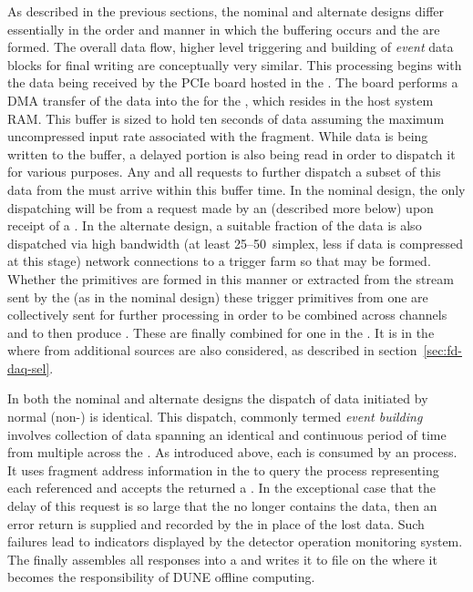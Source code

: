 As described in the previous sections, the nominal and alternate
designs differ essentially in the order and manner in which the
 buffering occurs and the  are
formed. 
The overall data flow, higher level triggering and building of
\textit{event} data blocks for final writing are conceptually very similar.
This processing begins with the data being received by the
 PCIe board hosted in the . 
The  board performs a DMA transfer of the data into the
 for the , which resides in the
 host system RAM.  %
This buffer is sized to hold ten seconds of data assuming the maximum 
uncompressed input rate associated with the fragment.
While data is being written to the buffer, a delayed portion is
also being read in order to dispatch it for various purposes.
Any and all requests to further dispatch a subset of this data from
the  must arrive within this buffer time.
In the nominal design, the only dispatching will be from a request
made by an  (described more below) upon receipt of a
. 
In the alternate design, a suitable fraction of the data is also
dispatched via high bandwidth (at least \numrange{25}{50}\,\si{\Gbps} simplex, less
if data is compressed at this stage) network connections to a trigger
farm so that  may be formed. 
Whether the primitives are formed in this manner or extracted from the
stream sent by the  (as in the nominal design) these
trigger primitives from one  are collectively sent for
further processing in order to be combined across channels and  to then 
produce . 
These are finally combined for one  in the
. 
It is in the  where  from additional
sources are also considered, as described in
section~\ref{sec:fd-daq-sel}.

In both the nominal and alternate designs the dispatch of data
initiated by normal (non-)  is
identical. 
This dispatch, commonly termed \textit{event building} involves collection
of data spanning an identical and continuous period of time from
multiple  across the .
As introduced above, each  is consumed by an
 process. 
It  uses fragment address information in the  to
query the  process representing each referenced
 and accepts the returned a .
In the exceptional case that the delay of this request is so large
that the  no longer contains the data, then an error
return is supplied and recorded by the  in place of the
lost data. 
Such failures lead to indicators displayed by the detector operation
monitoring system.
The  finally assembles all responses into a
 and writes it to file on the  where
it becomes the responsibility of DUNE offline computing.

